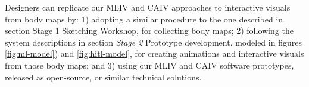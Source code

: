 Designers can replicate our MLIV and CAIV approaches to interactive visuals from body maps by: 1) adopting a similar procedure to the one described in section Stage 1 Sketching Workshop, for collecting body maps; 2) following the system descriptions in section \textit{Stage 2} Prototype development, modeled in figures \ref{fig:ml-model}) and \ref{fig:hitl-model}, for creating animations and interactive visuals from those body maps; and 3) using our MLIV and CAIV software prototypes, released as open-source, or similar technical solutions.

